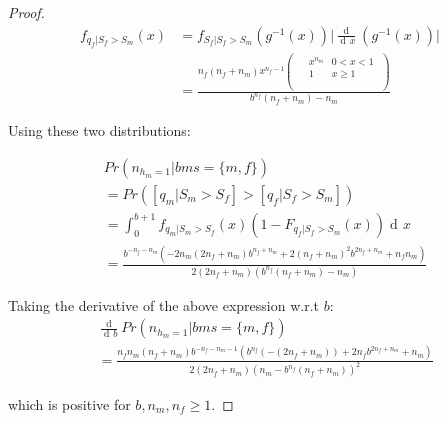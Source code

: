 \documentclass[11pt]{article}
\DeclareMathOperator{\di}{d\!}
\begin{document}
\begin{proof}
    \begin{align*}
        f_{q_f|S_f > S_m}(x) & = f_{S_f|S_f > S_m} (g^{-1}(x)) \lvert \frac{\di}{\di x} (g^{-1}(x)) \rvert \\
                             & = \frac{n_f (n_f+n_m) x^{n_f-1} \left(
            \begin{array}{cc}
                     &
                    \begin{array}{cc}
                        x^{n_m} & 0<x<1   \\
                        1       & x\geq 1 \\
                    \end{array}
                    \\
                \end{array}
            \right)}{b^{n_f} (n_f+n_m)-n_m}
    \end{align*}

    Using these two distributions:

    \begin{align*}
         & Pr(n_{h_m=1}|bm{s}=\{m,f\})                                                                                                                             \\
         & = Pr([q_m|S_m > S_f] > [q_f|S_f > S_m])                                                                                                                 \\
         & = \int_{0}^{b+1} f_{q_m|S_m > S_f}(x) (1-F_{q_f|S_f > S_m}(x)) \di x                                                                                    \\
         & = \frac{b^{-n_f-n_m} \left(-2 n_m (2 n_f+n_m) b^{n_f+n_m}+2 (n_f+n_m)^2 b^{2 n_f+n_m}+n_f n_m\right)}{2 (2 n_f+n_m) \left(b^{n_f} (n_f+n_m)-n_m\right)}
    \end{align*}

    Taking the derivative of the above expression w.r.t $b$:
    \begin{align*}
         & \frac{\di}{\di b} Pr(n_{h_m=1}|bm{s}=\{m,f\})                                                                                                             \\
         & = \frac{n_f n_m (n_f+n_m) b^{-n_f-n_m-1} \left(b^{n_f} (-(2 n_f+n_m))+2 n_f b^{2 n_f+n_m}+n_m\right)}{2 (2 n_f+n_m) \left(n_m-b^{n_f} (n_f+n_m)\right)^2}
    \end{align*}

    which is positive for $b, n_m, n_f \geq 1$.

\end{proof}
\end{document}
